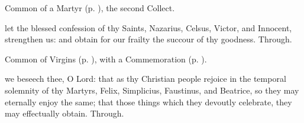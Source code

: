 \clearpage
{}

\begin{rubric}
	Common of a Martyr (p. \pageref{CommonMartyrNotBishopCollect}), the second Collect.
\end{rubric}




\memorialCollect
{} let the blessed confession of thy Saints, Nazarius, Celsus, Victor, and Innocent, strengthen us: and obtain for our frailty the succour of thy goodness. Through.


\vspace{-0.25\baselineskip}


\begin{rubric}
	Common of Virgins (p. \pageref{VirginOnlyCollect}), with a Commemoration  (p. \pageref{FelixEtc}).
\end{rubric}


\vspace{-0.25\baselineskip}

\label{FelixEtc}

\memorialCollect
{} we beseech thee, O Lord: that as thy Christian people rejoice in the temporal solemnity of thy Martyrs, Felix, Simplicius, Faustinus, and Beatrice, so they may eternally enjoy the same; that those things which they devoutly celebrate, they may effectually obtain. Through.


\vspace{-0.25\baselineskip}


